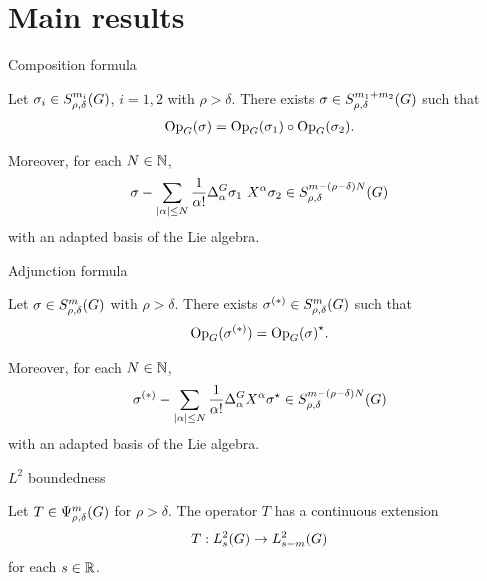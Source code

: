 \documentclass{beamer}
\begin{document}
\section{Main results}

\begin{frame}{Composition formula}
    \begin{theorem}
        Let $\sigma_i \in S^{m_i}_{\rho, \delta}(G)$, $i = 1, 2$ with $\rho > \delta$.
        There exists $\sigma \in S^{m_1 + m_2}_{\rho, \delta}(G)$ such that
        \begin{align*}
            \mathrm{Op}_{G}(\sigma) = \mathrm{Op}_{G}(\sigma_1) \circ \mathrm{Op}_{G}(\sigma_2).
        \end{align*}

        Moreover,
        for each $N \in \mathbb{N}$,
        \begin{align*}
            \sigma - \sum_{\abs \alpha \leq N} \frac 1 {\alpha!} \DifferenceOperator {\alpha} \sigma_1 \ \LeftDifferentialOperator {\alpha} \sigma_2 \in \SymbolClass {m - (\rho - \delta) N} {\rho, \delta}
        \end{align*}
        with an adapted basis of the Lie algebra.
    \end{theorem}
\end{frame}

\begin{frame}{Adjunction formula}
    \begin{theorem}
        Let $\sigma \in S^{m}_{\rho, \delta}(G)$ with $\rho > \delta$.
        There exists $\sigma^{(*)} \in S^{m}_{\rho, \delta}(G)$ such that
        \begin{align*}
            \mathrm{Op}_{G}(\sigma^{(*)}) = {\mathrm{Op}_{G}(\sigma)}^\star.
        \end{align*}

        Moreover,
        for each $N \in \mathbb{N}$,
        \begin{align*}
            \sigma^{(*)} - \sum_{\abs \alpha \leq N} \frac 1 {\alpha!} \DifferenceOperator {\alpha} \LeftDifferentialOperator {\alpha} \adj \sigma \in \SymbolClass {m - (\rho - \delta) N} {\rho, \delta}
        \end{align*}
        with an adapted basis of the Lie algebra.
    \end{theorem}
\end{frame}

\begin{frame}{$L^2$ boundedness}
    \begin{theorem}[$L^2$ boundedness]
        Let $T \in \Psi^{m}_{\rho, \delta}(G)$ for $\rho > \delta$.
        The operator $T$ has a continuous extension
        \begin{align*}
            T : L^2_{s}(G) \to L^2_{s - m}(G)
        \end{align*}
        for each $s \in \mathbb{R}$.
    \end{theorem}
\end{frame}
\end{document}
